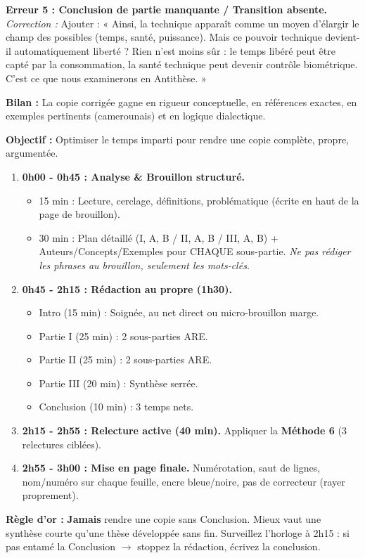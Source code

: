 \documentclass[11pt]{article}
\newcommand{\cle}[1]{{\popxbold\color{popdark}#1}}
\begin{document}
\begin{exoresolu}
\textbf{Erreur 5 : Conclusion de partie manquante / Transition absente.}
\textit{Correction :} Ajouter : « Ainsi, la technique apparaît comme un \cle{moyen} d'élargir le champ des possibles (temps, santé, puissance). Mais ce pouvoir technique devient-il automatiquement liberté ? Rien n'est moins sûr : le temps libéré peut être capté par la consommation, la santé technique peut devenir contrôle biométrique. C'est ce que nous examinerons en Antithèse. »

\textbf{Bilan :} La copie corrigée gagne en rigueur conceptuelle, en références exactes, en exemples pertinents (camerounais) et en logique dialectique.
\end{exoresolu}

\begin{methode}
\textbf{Objectif :} Optimiser le temps imparti pour rendre une copie complète, propre, argumentée.
\begin{enumerate}
    \item \textbf{0h00 - 0h45 : Analyse \& Brouillon structuré.}
        \begin{itemize}
            \item 15 min : Lecture, cerclage, définitions, problématique (écrite en haut de la page de brouillon).
            \item 30 min : Plan détaillé (I, A, B / II, A, B / III, A, B) + Auteurs/Concepts/Exemples pour CHAQUE sous-partie. \emph{Ne pas rédiger les phrases au brouillon, seulement les mots-clés.}
        \end{itemize}
    \item \textbf{0h45 - 2h15 : Rédaction au propre (1h30).}
        \begin{itemize}
            \item Intro (15 min) : Soignée, au net direct ou micro-brouillon marge.
            \item Partie I (25 min) : 2 sous-parties ARE.
            \item Partie II (25 min) : 2 sous-parties ARE.
            \item Partie III (20 min) : Synthèse serrée.
            \item Conclusion (10 min) : 3 temps nets.
        \end{itemize}
    \item \textbf{2h15 - 2h55 : Relecture active (40 min).} Appliquer la \textbf{Méthode 6} (3 relectures ciblées).
    \item \textbf{2h55 - 3h00 : Mise en page finale.} Numérotation, saut de lignes, nom/numéro sur chaque feuille, encre bleue/noire, pas de correcteur (rayer proprement).
\end{enumerate}
\textbf{Règle d'or :} \textbf{Jamais} rendre une copie sans Conclusion. Mieux vaut une synthèse courte qu'une thèse développée sans fin. Surveillez l'horloge à 2h15 : si pas entamé la Conclusion $\rightarrow$ stoppez la rédaction, écrivez la conclusion.
\end{methode}
\end{document}
